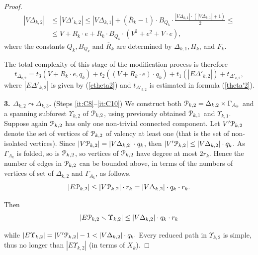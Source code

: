 \documentclass[a4paper,12pt]{article}
\newcommand{\G}{\Gamma }
\newcommand{\D}{\Delta }
\newcommand{\U}{\Upsilon }
\newcommand{\cP}{{\cal{P}}}
\numberwithin{equation}{section}
\numberwithin{figure}{section}
\begin{document}
\begin{proof}
\begin{equation}\label{vtheta2}
\begin{split}
|V\D_{k,2}| &\le |V \D'_{k,2}| \le |V\D_{k,1}|+(\overline{R}_k-1)\cdot B_{Q_k}
\cdot \frac{|V\D_{k,1}|\cdot(|V\D_{k,1}|+1)}{2}\le\\ &\le V + R_k \cdot e +
\overline{R}_k \cdot B_{Q_k}\cdot (V^2 + e^2+V\cdot e),
\end{split}
\end{equation}
where the constants $Q_k, B_{Q_k}$ and  $\overline{R}_k$ are determined  by $\D_{k,1},
H_k$, and $F_k$.


The total complexity of this stage of the modification process is
therefore
\begin{equation}\label{theta2}
t_{\D_{k,2}} = t_3(V + R_k \cdot e, q_k) + t_2((V + R_k \cdot e) \cdot
q_k)+ t_1(|E\D'_{k,2}|) + t_{\D'_{k,2}},
\end{equation}
where $|E\D'_{k,2}|$ is given by (\ref{etheta2}) and $t_{\D'_{k,2}}$ is
estimated in formula (\ref{theta'2}).


{\bf 3. $\D_{k,2} \leadsto \D_{k,3}$.} (Steps \ref{it:C8}--\ref{it:C10}) We construct both $\cP_{k,2}=\D_{k,2}\times \G_{A_k}$ and a spanning
subforest $\U_{k,2}$ of $\cP_{k,2}$, using previously obtained $\cP_{k,1}$ and $\U_{k,1}$. Suppose again
$\cP_{k,2}$ has only one non-trivial connected component.
 Let $V'\cP_{k,2}$ denote the set of vertices of $\cP_{k,2}$ of valency at least one
(that is the set of non-isolated vertices). Since $|V\cP_{k,2}|=|V\D_{k,2}|\cdot q_k$, then $|V'\cP_{k,2}|
\le |V\D_{k,2}|\cdot q_k$. As $\G_{A_k}$ is folded, so is $\cP_{k,2}$, so
vertices of $\cP_{k,2}$ have degree at most $2r_k$. Hence the number of
edges in $\cP_{k,2}$ can be bounded above, in terms of the numbers of
vertices of set of $\D_{k,2}$ and $\G_{A_k}$, as follows.
\[ |E\cP_{k,2}| \le |V\cP_{k,2}|\cdot r_k =|V\D_{k,2}|\cdot q_k \cdot r_k.\]

Then
\[|E\cP_{k,2}\smallsetminus \U_{k,2}| \le |V\D_{k,2}|\cdot q_k \cdot r_k\]

while $|E \U_{k,2}| = |V'\cP_{k,2}| - 1 < |V\D_{k,2}|\cdot q_k.$ Every reduced
path in $\U_{k,2}$ is simple, thus no longer than $|E\U_{k,2}|$ (in terms
of $X_k$).


\end{proof}
\end{document}
